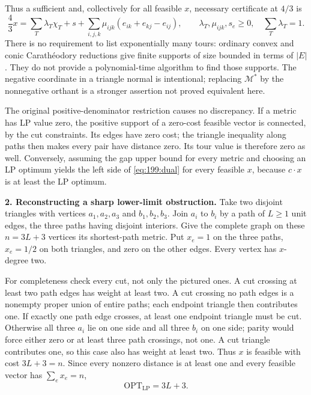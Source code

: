 \documentclass[11pt,a4paper]{article}
\numberwithin{equation}{section}
\begin{document}
Thus a sufficient and, collectively for all feasible $x$, necessary
certificate at $4/3$ is
\begin{equation}\label{eq:199:certificate}
 \frac43 x=\sum_T\lambda_T\chi_T+s+
       \sum_{i,j,k}\mu_{ijk}(e_{ik}+e_{kj}-e_{ij}),
 \qquad
 \lambda_T,\mu_{ijk},s_e\ge0,\quad\sum_T\lambda_T=1.
\end{equation}
There is no requirement to list exponentially many tours: ordinary
convex and conic Carath\'eodory reductions give finite supports of
size bounded in terms of $|E|$. They do not provide a polynomial-time
algorithm to find those supports. The negative coordinate in a triangle
normal is intentional; replacing $\mathcal M^*$ by the nonnegative
orthant is a stronger assertion not proved equivalent here.

The original positive-denominator restriction causes no discrepancy.
If a metric has LP value zero, the positive support of a zero-cost
feasible vector is connected, by the cut constraints. Its edges have
zero cost; the triangle inequality along paths then makes every pair
have distance zero. Its tour value is therefore zero as well.
Conversely, assuming the gap upper bound for every metric and choosing
an LP optimum yields the left side of \eqref{eq:199:dual} for every
feasible $x$, because $c\cdot x$ is at least the LP optimum.

\textbf{2. Reconstructing a sharp lower-limit obstruction.}
Take two disjoint triangles with vertices $a_1,a_2,a_3$ and
$b_1,b_2,b_3$. Join $a_i$ to $b_i$ by a path of $L\ge1$ unit edges,
the three paths having disjoint interiors. Give the complete graph on
these $n=3L+3$ vertices its shortest-path metric. Put $x_e=1$ on the
three paths, $x_e=1/2$ on both triangles, and zero on the other edges.
Every vertex has $x$-degree two.

For completeness check every cut, not only the pictured ones. A cut
crossing at least two path edges has weight at least two. A cut crossing
no path edges is a nonempty proper union of entire paths; each endpoint
triangle then contributes one. If exactly one path edge crosses, at
least one endpoint triangle must be cut. Otherwise all three $a_i$
lie on one side and all three $b_i$ on one side; parity would force
either zero or at least three path crossings, not one. A cut triangle
contributes one, so this case also has weight at least two.
Thus $x$ is feasible with cost $3L+3=n$. Since every nonzero distance
is at least one and every feasible vector has $\sum_e x_e=n$,
\begin{equation}\label{eq:199:lowerlp}
                         \mathrm{OPT}_{\mathrm{LP}}=3L+3.
\end{equation}
\end{document}
